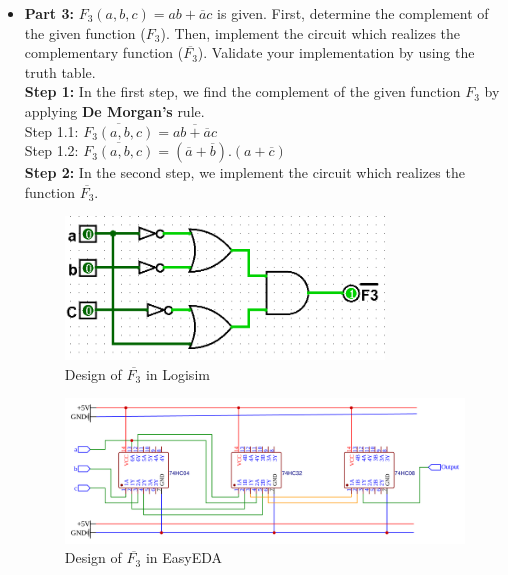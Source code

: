 \documentclass[pdftex,12pt,a4paper]{article}
\begin{document}
\begin{itemize}
    \item \textbf{Part 3:} $F_3 (a, b, c) = ab + \overline{a}c$ is given. First, determine the complement of the given function ($F_3$). Then, implement the circuit which realizes the complementary function ($\overline{F_3}$). Validate your implementation by using the truth table.\\

    \textbf{Step 1:} In the first step, we find the complement of the given function $F_3$ by applying \textbf{De Morgan's} rule.\\
    
    Step 1.1: $\overline{F_3 (a, b, c)} = \overline{ab + \overline{a}c}$ \\
    
    Step 1.2: $\overline{F_3 (a, b, c)} = (\overline{a} + \overline{b}) . (a + \overline{c})$\\
    \newpage
    \textbf{Step 2:} In the second step, we implement the circuit which realizes the function $\overline{F_3}$.\\
    \begin{figure}[H]
    \centering
        \includegraphics[width=0.8\textwidth]{F3comp.png}	
        \caption{Design of \textbf{$\overline{F_3}$} in Logisim}
   \end{figure}
   
	\begin{figure}[H]
    \centering
        \includegraphics[width=\textwidth]{EasyEDA_part_3.png}	
        \caption{Design of \textbf{$\overline{F_3}$} in EasyEDA}        
	\end{figure}   
   

\end{itemize}
\end{document}
